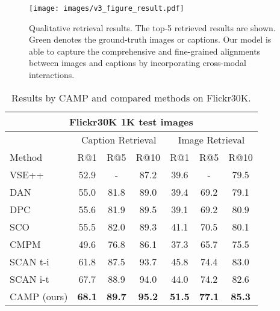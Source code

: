 \documentclass[10pt,twocolumn,letterpaper]{article}
\begin{document}
\begin{figure*}
\vspace{-10pt}
\begin{center}
   \texttt{[image: images/v3\_figure\_result.pdf]}
\end{center}
\vspace{-2.5mm}
   \caption{Qualitative retrieval results. The top-5 retrieved results are shown. Green denotes the ground-truth images or captions. Our model is able to capture the comprehensive and fine-grained alignments between images and captions by incorporating cross-modal interactions.}
\label{fig:results}
\vspace{-5mm}
\end{figure*}

\begin{table}
\begin{center}
\small
\setlength{\tabcolsep}{1.3mm}
\begin{tabular}{|l|ccc|ccc|}
\hline
\multicolumn{7}{|c|}{Flickr30K 1K test images}\\
\hline
& \multicolumn{3}{c|}{Caption Retrieval}
& \multicolumn{3}{c|}{Image Retrieval} \\
{Method}
& {R@1} & {R@5} & {R@10}
& {R@1} & {R@5} & {R@10}  \\
\hline\hline
VSE++~\cite{faghri2017vse++} & 52.9 & - & 87.2 & 39.6 & - & 79.5 \\
DAN~\cite{nam2016dual} & 55.0 & 81.8 & 89.0 & 39.4 & 69.2 & 79.1 \\
DPC~\cite{zheng2017dual} & 55.6 & 81.9 & 89.5 & 39.1 & 69.2 & 80.9 \\
SCO~\cite{huang2017learning} & 55.5 & 82.0 & 89.3 & 41.1 & 70.5 & 80.1 \\
CMPM~\cite{ying2018CMPM} & 49.6 & 76.8 & 86.1 & 37.3 & 65.7 & 75.5 \\
SCAN t-i~\cite{lee2018stacked} & 61.8 & 87.5 & 93.7 & 45.8 & 74.4 & 83.0 \\
SCAN i-t~\cite{lee2018stacked} & 67.7 & 88.9 & 94.0 & 44.0 & 74.2 & 82.6 \\
\hline
CAMP (ours) & \textbf{68.1} & \textbf{89.7} & \textbf{95.2} & \textbf{51.5} & \textbf{77.1} & \textbf{85.3} \\
\hline
\end{tabular}
\end{center}
\vspace{-1.5mm}
\caption{Results by CAMP and compared methods on Flickr30K.}
\label{tab:f30k}
\vspace{-5mm}
\end{table}
\end{document}
